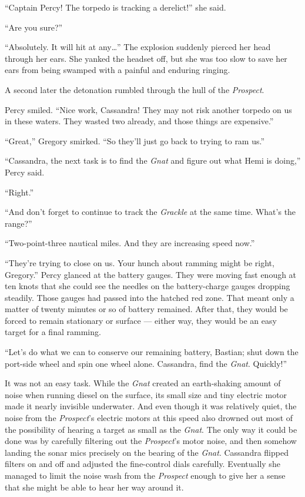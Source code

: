 \documentclass[
]{scrbook}
\begin{document}
``Captain Percy! The torpedo is tracking a derelict!'' she said.

``Are you sure?''

``Absolutely. It will hit at any\ldots{}'' The explosion suddenly
pierced her head through her ears. She yanked the headset off, but she
was too slow to save her ears from being swamped with a painful and
enduring ringing.

A second later the detonation rumbled through the hull of the
\emph{Prospect}.

Percy smiled. ``Nice work, Cassandra! They may not risk another torpedo
on us in these waters. They wasted two already, and those things are
expensive.''

``Great,'' Gregory smirked. ``So they'll just go back to trying to ram
us.''

``Cassandra, the next task is to find the \emph{Gnat} and figure out
what Hemi is doing,'' Percy said.

``Right.''

``And don't forget to continue to track the \emph{Grackle} at the same
time. What's the range?''

``Two-point-three nautical miles. And they are increasing speed now.''

``They're trying to close on us. Your hunch about ramming might be
right, Gregory.'' Percy glanced at the battery gauges. They were moving
fast enough at ten knots that she could see the needles on the
battery-charge gauges dropping steadily. Those gauges had passed into
the hatched red zone. That meant only a matter of twenty minutes or so
of battery remained. After that, they would be forced to remain
stationary or surface --- either way, they would be an easy target for a
final ramming.

``Let's do what we can to conserve our remaining battery, Bastian; shut
down the port-side wheel and spin one wheel alone. Cassandra, find the
\emph{Gnat}. Quickly!''

It was not an easy task. While the \emph{Gnat} created an earth-shaking
amount of noise when running diesel on the surface, its small size and
tiny electric motor made it nearly invisible underwater. And even though
it was relatively quiet, the noise from the \emph{Prospect}'s electric
motors at this speed also drowned out most of the possibility of hearing
a target as small as the \emph{Gnat}. The only way it could be done was
by carefully filtering out the \emph{Prospect}'s motor noise, and then
somehow landing the sonar mics precisely on the bearing of the
\emph{Gnat}. Cassandra flipped filters on and off and adjusted the
fine-control dials carefully. Eventually she managed to limit the noise
wash from the \emph{Prospect} enough to give her a sense that she might
be able to hear her way around it.
\end{document}
